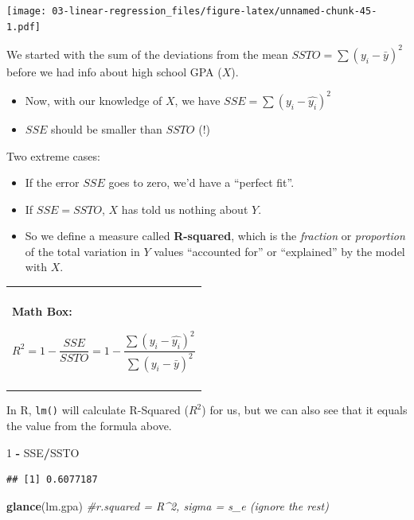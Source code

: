 \documentclass[
]{book}
\newenvironment{Shaded}{\begin{snugshade}}{\end{snugshade}}
\newcommand{\CommentTok}[1]{\textcolor[rgb]{0.56,0.35,0.01}{\textit{#1}}}
\newcommand{\DecValTok}[1]{\textcolor[rgb]{0.00,0.00,0.81}{#1}}
\newcommand{\KeywordTok}[1]{\textcolor[rgb]{0.13,0.29,0.53}{\textbf{#1}}}
\newcommand{\NormalTok}[1]{#1}
\newcommand{\OperatorTok}[1]{\textcolor[rgb]{0.81,0.36,0.00}{\textbf{#1}}}
\newcommand{\StringTok}[1]{\textcolor[rgb]{0.31,0.60,0.02}{#1}}
\newenvironment{mathbox}
{
    \begin{center}
    
    \begin{tabular}{|p{0.8\textwidth}|}
    \rowcolor{LightYellow}
    \hline\\
    \rowcolor{LightYellow}
    \textbf{Math Box:}
}
{
    \\\rowcolor{LightYellow}
    \\\hline
    \end{tabular} 
    \end{center}
}
\begin{document}
\texttt{[image: 03-linear-regression\_files/figure-latex/unnamed-chunk-45-1.pdf]}

We started with the sum of the deviations from the mean \(SSTO = \sum{(y_i - \bar{y})^2}\) before we had info about high school GPA (\(X\)).

\begin{itemize}
\item
  Now, with our knowledge of \(X\), we have \(SSE = \sum{(y_i - \hat{y_i})^2}\)
\item
  \(SSE\) should be smaller than \(SSTO\) (!)
\end{itemize}

Two extreme cases:

\begin{itemize}
\item
  If the error \(SSE\) goes to zero, we'd have a ``perfect fit''.
\item
  If \(SSE = SSTO\), \(X\) has told us nothing about \(Y\).
\item
  So we define a measure called \textbf{R-squared}, which is the \emph{fraction} or \emph{proportion} of the total variation in \(Y\) values ``accounted for'' or ``explained'' by the model with \(X\).
\end{itemize}

\begin{mathbox}
\[ R^2 = 1 - \frac{SSE}{SSTO} = 1 - \frac{ \sum{(y_i - \hat{y_i})^2}}{ \sum{(y_i - \bar{y})^2}}\]
\end{mathbox}

In R, \texttt{lm()} will calculate R-Squared (\(R^2\)) for us, but we can also see that it equals the value from the formula above.

\begin{Shaded}
\begin{Highlighting}[]
\DecValTok{1} \OperatorTok{-}\StringTok{ }\NormalTok{SSE}\OperatorTok{/}\NormalTok{SSTO}
\end{Highlighting}
\end{Shaded}

\begin{verbatim}
## [1] 0.6077187
\end{verbatim}

\begin{Shaded}
\begin{Highlighting}[]
\KeywordTok{glance}\NormalTok{(lm.gpa) }\CommentTok{#r.squared = R^2, sigma = s_e (ignore the rest)}
\end{Highlighting}
\end{Shaded}
\end{document}
